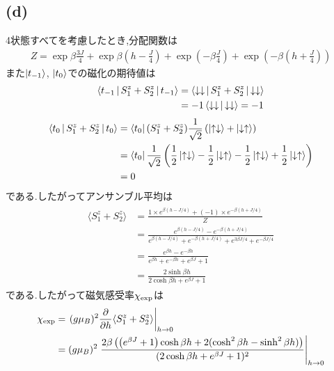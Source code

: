 \documentclass[uplatex,a4j,11pt,dvipdfmx]{jsarticle}
\newcommand{\up}{\uparrow}
\newcommand{\dn}{\downarrow}
\begin{document}
\subsection*{(d)}
4状態すべてを考慮したとき,分配関数は
\begin{align}
  Z=\exp\beta\frac{3J}{4}+\exp\beta\left(h-\frac{J}{4}\right)+\exp\left(-\beta\frac{J}{4}\right)+\exp\left(-\beta\left(h+\frac{J}{4}\right)\right)
\end{align}
また$\Ket{t_{-1}}$, $\Ket{t_0}$での磁化の期待値は
\begin{align}
  \begin{split}
    \Braket{t_{-1}|S_1^z+S_2^z|t_{-1}}&=\Braket{\dn\dn|S_1^z+S_2^z|\dn\dn}\\
    &=-1\Braket{\dn\dn|\dn\dn}=-1
  \end{split}
\end{align}
\begin{align}
  \begin{split}
    \Braket{t_0|S_1^z+S_2^z|t_0}&=\Bra{t_0}(S_1^z+S_2^z)\frac{1}{\sqrt{2}}\left(\Ket{\up\dn}+\Ket{\dn\up}\right)\\
    &=\Bra{t_0}\frac{1}{\sqrt{2}}\left(\frac{1}{2}\Ket{\up\dn}-\frac{1}{2}\Ket{\dn\up}-\frac{1}{2}\Ket{\up\dn}+\frac{1}{2}\Ket{\dn\up}\right)\\
    &=0
  \end{split}
\end{align}
である.したがってアンサンブル平均は
\begin{align}
  \begin{split}
    \langle S_1^z+S_2^z\rangle&=\frac{1\times e^{\beta(h-J/4)}+(-1)\times e^{-\beta(h+J/4)}}{Z}\\
    &=\frac{e^{\beta(h-J/4)}-e^{-\beta(h+J/4)}}{e^{\beta(h-J/4)}+e^{-\beta(h+J/4)}+e^{3\beta J/4}+e^{-\beta J/4}}\\
    &=\frac{e^{\beta h}-e^{-\beta h}}{e^{\beta h}+e^{-\beta h}+e^{\beta J}+1}\\
    &=\frac{2\sinh\beta h}{2\cosh\beta h+e^{\beta J}+1}
  \end{split}
\end{align}
である.したがって磁気感受率$\chi_{\rm exp}$は
\begin{align}
  \begin{split}
    \chi_{\rm exp}&=\left.(g\mu_B)^2\frac{\partial}{\partial h}\langle S_1^z+S_2^z\rangle\right|_{h\rightarrow 0}\\
    &=(g\mu_B)^2\left.\frac{2\beta\left(\left(e^{\beta J}+1\right)\cosh\beta h+2(\cosh^2\beta h-\sinh^2\beta h)\right)}{(2\cosh\beta h+e^{\beta J}+1)^2}\right|_{h\rightarrow0}
  \end{split}
\end{align}
\end{document}
